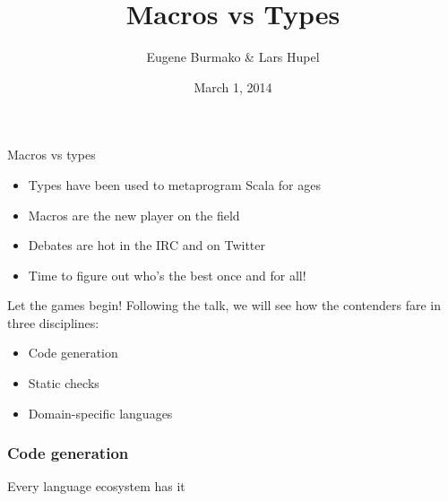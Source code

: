 \documentclass{beamer}
\begin{document}
  \title{Macros vs Types}
  \author{Eugene Burmako \& Lars Hupel}
  \date{March 1, 2014}

{
\begin{frame}
  \titlepage
\end{frame}
}

\begin{frame}{Macros vs types}
  \begin{itemize}
  \item Types have been used to metaprogram Scala for ages
  \item Macros are the new player on the field
  \item Debates are hot in the IRC and on Twitter
  \item Time to figure out who's the best once and for all!
  \end{itemize}
\end{frame}

\begin{frame}{Let the games begin!}
  Following the  talk, we will see how the contenders fare in three disciplines:

  \vspace{1em}
  \begin{itemize}
  \item Code generation
  \item Static checks
  \item Domain-specific languages
  \end{itemize}
\end{frame}


\begin{frame}[fragile]
\frametitle{Code generation}
  Every language ecosystem has it
\end{frame}
\end{document}
